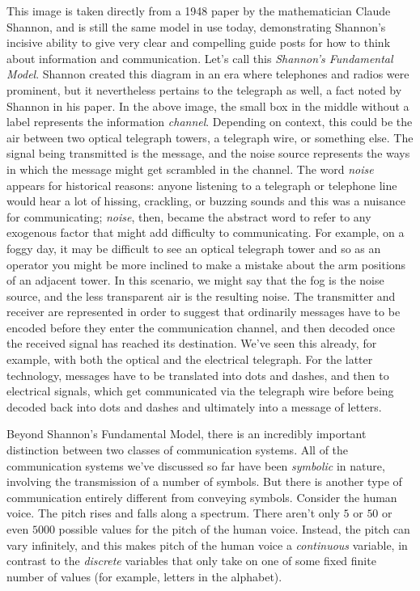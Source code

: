 \documentclass[UTF8]{book}
\begin{document}
\begin{CJK}{UTF8}{gbsn}
This image is taken directly from a 1948 paper by the mathematician Claude Shannon, and is still the same model in use today, demonstrating Shannon's incisive ability to give very clear and compelling guide posts for how to think about information and communication. Let's call this \emph{Shannon's Fundamental Model}. Shannon created this diagram in an era where telephones and radios were prominent, but it nevertheless pertains to the telegraph as well, a fact noted by Shannon in his paper. In the above image, the small box in the middle without a label represents the information \emph{channel}. Depending on context, this could be the air between two optical telegraph towers, a telegraph wire, or something else. The signal being transmitted is the message, and the noise source represents the ways in which the message might get scrambled in the channel. The word \emph{noise} appears for historical reasons: anyone listening to a telegraph or telephone line would hear a lot of hissing, crackling, or buzzing sounds and this was a nuisance for communicating; \emph{noise}, then, became the abstract word to refer to any exogenous factor that might add difficulty to communicating. For example, on a foggy day, it may be difficult to see an optical telegraph tower and so as an operator you might be more inclined to make a mistake about the arm positions of an adjacent tower. In this scenario, we might say that the fog is the noise source, and the less transparent air is the resulting noise. The transmitter and receiver are represented in order to suggest that ordinarily messages have to be encoded before they enter the communication channel, and then decoded once the received signal has reached its destination. We've seen this already, for example, with both the optical and the electrical telegraph. For the latter technology, messages have to be translated into dots and dashes, and then to electrical signals, which get communicated via the telegraph wire before being decoded back into dots and dashes and ultimately into a message of letters.

Beyond Shannon's Fundamental Model, there is an incredibly important distinction between two classes of communication systems. All of the communication systems we've discussed so far have been \emph{symbolic} in nature, involving the transmission of a number of symbols. But there is another type of communication entirely different from conveying symbols. Consider the human voice. The pitch rises and falls along a spectrum. There aren't only $5$ or $50$ or even $5000$ possible values for the pitch of the human voice. Instead, the pitch can vary infinitely, and this makes pitch of the human voice a \emph{continuous} variable, in contrast to the \emph{discrete} variables that only take on one of some fixed finite number of values (for example, letters in the alphabet).


\end{CJK}
\end{document}
